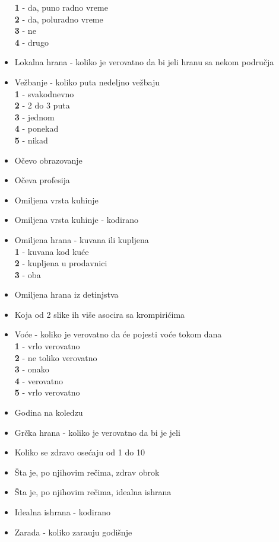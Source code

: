 \documentclass[12pt,a4paper]{article}
\begin{document}
\begin{itemize}
    \textbf{1} - da, puno radno vreme\\
    \textbf{2} - da, poluradno vreme\\
    \textbf{3} - ne\\
    \textbf{4} - drugo
  \item Lokalna hrana - koliko je verovatno da bi jeli hranu sa nekom podru\v cja
  \item Ve\v zbanje - koliko puta nedeljno ve\v zbaju\\
    \textbf{1} - svakodnevno\\
    \textbf{2} - 2 do 3 puta\\
    \textbf{3} - jednom\\
    \textbf{4} - ponekad\\
    \textbf{5} - nikad
  \item O\v cevo obrazovanje
  \item O\v ceva profesija
  \item Omiljena vrsta kuhinje
  \item Omiljena vrsta kuhinje - kodirano
  \item Omiljena hrana - kuvana ili kupljena\\
    \textbf{1} - kuvana kod ku\' ce\\
    \textbf{2} - kupljena u prodavnici\\
    \textbf{3} - oba
  \item Omiljena hrana iz detinjstva
  \item Koja od 2 slike ih vi\v se asocira sa krompiri\' cima
  \item Vo\' ce - koliko je verovatno da \'ce pojesti vo\'ce tokom dana\\
    \textbf{1} - vrlo verovatno\\
    \textbf{2} - ne toliko verovatno\\
    \textbf{3} - onako\\
    \textbf{4} - verovatno\\
    \textbf{5} - vrlo verovatno
  \item Godina na koledzu
  \item Gr\v cka hrana - koliko je verovatno da bi je jeli
  \item Koliko se zdravo ose\' caju od 1 do 10
  \item \v Sta je, po njihovim re\v cima, zdrav obrok
  \item \v Sta je, po njihovim re\v cima, idealna ishrana
  \item Idealna ishrana - kodirano
  \item Zarada - koliko zara\dj uju godi\v snje\\

\end{itemize}
\end{document}
